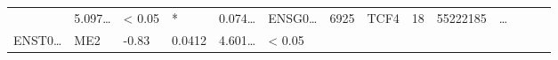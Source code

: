\documentclass[
]{article}
\begin{document}
\begin{longtable}[]{@{}llllllllllllll@{}}
\begin{minipage}[t]{0.04\columnwidth}
\end{minipage} & \begin{minipage}[t]{0.05\columnwidth}\raggedright
5.097\ldots{}\strut
\end{minipage} & \begin{minipage}[t]{0.05\columnwidth}\raggedright
\textless{} 0.05\strut
\end{minipage} & \begin{minipage}[t]{0.03\columnwidth}\raggedright
*\strut
\end{minipage} & \begin{minipage}[t]{0.05\columnwidth}\raggedright
0.074\ldots{}\strut
\end{minipage} & \begin{minipage}[t]{0.05\columnwidth}\raggedright
ENSG0\ldots{}\strut
\end{minipage} & \begin{minipage}[t]{0.05\columnwidth}\raggedright
6925\strut
\end{minipage} & \begin{minipage}[t]{0.05\columnwidth}\raggedright
TCF4\strut
\end{minipage} & \begin{minipage}[t]{0.05\columnwidth}\raggedright
18\strut
\end{minipage} & \begin{minipage}[t]{0.05\columnwidth}\raggedright
55222185\strut
\end{minipage} & \begin{minipage}[t]{0.02\columnwidth}\raggedright
\ldots{}\strut
\end{minipage}\tabularnewline
\begin{minipage}[t]{0.05\columnwidth}\raggedright
ENST0\ldots{}\strut
\end{minipage} & \begin{minipage}[t]{0.04\columnwidth}\raggedright
ME2\strut
\end{minipage} & \begin{minipage}[t]{0.04\columnwidth}\raggedright
-0.83\strut
\end{minipage} & \begin{minipage}[t]{0.04\columnwidth}\raggedright
0.0412\strut
\end{minipage} & \begin{minipage}[t]{0.05\columnwidth}\raggedright
4.601\ldots{}\strut
\end{minipage} & \begin{minipage}[t]{0.05\columnwidth}\raggedright
\textless{} 0.05\strut

\end{minipage}
\end{longtable}
\end{document}
